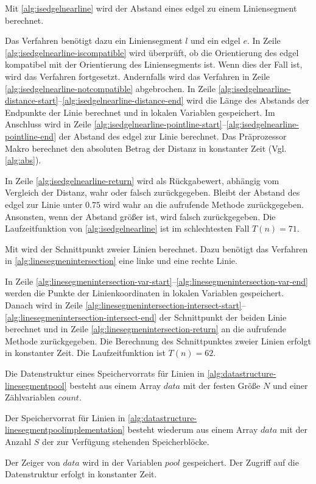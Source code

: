 Mit \autoref{alg:isedgelnearline} wird der Abstand eines \gls{edgel} zu einem Liniensegment berechnet.

Das Verfahren benötigt dazu ein Liniensegment $l$ und ein \gls{edgel} $e$. In Zeile
 \ref{alg:isedgelnearline-iscompatible} wird überprüft, ob die Orientierung des \gls{edgel} kompatibel mit der
 Orientierung des Liniensegments ist. Wenn dies der Fall ist, wird das Verfahren fortgesetzt. Andernfalls wird das
 Verfahren in Zeile \ref{alg:isedgelnearline-notcompatible} abgebrochen. In Zeile
 \ref{alg:isedgelnearline-distance-start}--\ref{alg:isedgelnearline-distance-end} wird die Länge des Abstands der
 Endpunkte der Linie berechnet und in lokalen Variablen gespeichert. Im Anschluss wird in Zeile
 \ref{alg:isedgelnearline-pointline-start}--\ref{alg:isedgelnearline-pointline-end} der Abstand des \gls{edgel} zur
 Linie berechnet. Das Präprozessor Makro  berechnet den absoluten Betrag der Distanz in konstanter Zeit
 (Vgl. \autoref{alg:abs}).

In Zeile \ref{alg:isedgelnearline-return} wird als Rückgabewert, abhängig vom Vergleich der Distanz, wahr oder falsch
 zurückgegeben. Bleibt der Abstand des \gls{edgel} zur Linie unter $0.75$ wird wahr an die aufrufende Methode
 zurückgegeben. Ansonsten, wenn der Abstand größer ist, wird falsch zurückgegeben. Die Laufzeitfunktion von
 \autoref{alg:isedgelnearline} ist im schlechtesten Fall $T(n) = 71$.

Mit  wird der Schnittpunkt zweier Linien berechnet. Dazu benötigt das Verfahren in
 \autoref{alg:linesegmenintersection} eine linke und eine rechte Linie.

 In Zeile \ref{alg:linesegmenintersection-var-start}--\ref{alg:linesegmenintersection-var-end} werden die Punkte der
 Linienkoordinaten in lokalen Variablen gespeichert. Danach wird in Zeile
 \ref{alg:linesegmenintersection-intersect-start}--\ref{alg:linesegmenintersection-intersect-end} der Schnittpunkt der
 beiden Linie berechnet und in Zeile \ref{alg:linesegmenintersection-return} an die aufrufende Methode zurückgegeben.
 Die Berechnung des Schnittpunktes zweier Linien erfolgt in konstanter Zeit. Die Laufzeitfunktion ist $T(n) = 62$.

Die Datenstruktur eines Speichervorrats für Linien in \autoref{alg:datastructure-linesegmentpool} besteht aus einem
 Array $\mathit{data}$ mit der festen Größe $N$ und einer Zählvariablen $\mathit{count}$.

Der Speichervorrat für Linien in \autoref{alg:datastructure-linesegmentpoolimplementation} besteht wiederum aus einem
 Array $\mathit{data}$ mit der Anzahl $S$ der zur Verfügung stehenden Speicherblöcke.

Der Zeiger von $\mathit{data}$ wird in der Variablen $\mathit{pool}$ gespeichert. Der Zugriff auf die Datenstruktur
 erfolgt in konstanter Zeit.

